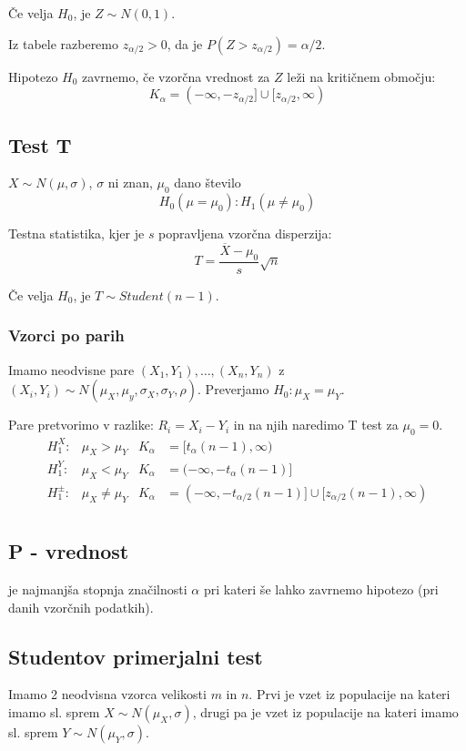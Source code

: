 \begin{multicols}{5}
Če velja $H_0$, je $Z \sim N(0,1)$.

Iz tabele razberemo $z_{\alpha/2} > 0$, da je $P(Z > z_{\alpha/2}) = \alpha/2$.

Hipotezo $H_0$ zavrnemo, če vzorčna vrednost za $Z$ leži na kritičnem območju:
\[ K_\alpha = (-\infty, -z_{\alpha/2}] \cup [z_{\alpha/2}, \infty)\]

\subsection{Test T}
$X \sim N(\mu, \sigma)$, $\sigma$ ni znan, $\mu_0$ dano število
\[ H_0(\mu = \mu_0) : H_1(\mu \neq \mu_0)\]

Testna statistika, kjer je $s$ popravljena vzorčna disperzija:
\[ T = \frac{\overline{X} - \mu_0}{s} \sqrt{n}\]

Če velja $H_0$, je $T \sim Student(n-1)$.

\subsubsection{Vzorci po parih}
Imamo neodvisne pare $(X_1, Y_1), \dots, (X_n, Y_n)$ z $(X_i, Y_i) \sim N(\mu_X, \mu_y, \sigma_X, \sigma_Y, \rho)$. Preverjamo $H_0: \mu_X = \mu_Y$.

Pare pretvorimo v razlike: $R_i = X_i - Y_i$ in na njih naredimo T test za $\mu_0 = 0$.
{\small
\begin{align*}
    H_1^X:& \mu_X > \mu_Y & K_\alpha &= [t_\alpha(n-1), \infty) \\
    H_1^Y:& \mu_X < \mu_Y & K_\alpha &= (-\infty, -t_\alpha(n-1)] \\
    H_1^\pm:& \mu_X \neq \mu_Y & K_\alpha &= (-\infty, -t_{\alpha/2}(n-1)] \cup [z_{\alpha / 2}(n-1), \infty) \\
\end{align*}}

\subsection{P - vrednost}
je najmanjša stopnja značilnosti $\alpha$ pri kateri še lahko zavrnemo hipotezo (pri danih vzorčnih podatkih).

\subsection{Studentov primerjalni test}
Imamo 2 neodvisna vzorca velikosti $m$ in $n$. Prvi je vzet iz populacije na kateri imamo sl. sprem $X \sim N(\mu_X, \sigma)$, drugi pa je 
vzet iz populacije na kateri imamo sl. sprem $Y \sim N(\mu_Y, \sigma)$. 


\end{multicols}
